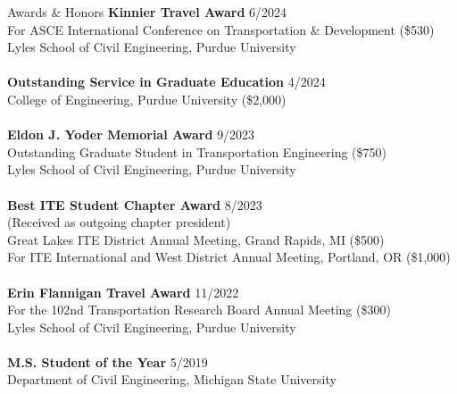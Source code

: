 \documentclass{CV} %
\begin{document}
\begin{rSection}{Awards \& Honors}%
    \textbf{Kinnier Travel Award} \hfill {6/2024}
    \\ For ASCE International Conference on Transportation \& Development (\$530)
    \\ Lyles School of Civil Engineering, Purdue University \\
    \\ \textbf{Outstanding Service in Graduate Education} \hfill {4/2024}
    \\ College of Engineering, Purdue University (\$2,000) \\
    \\ \textbf{Eldon J. Yoder Memorial Award} \hfill {9/2023}
    \\ Outstanding Graduate Student in Transportation Engineering (\$750)
    \\ Lyles School of Civil Engineering, Purdue University \\
    \\ \textbf{Best ITE Student Chapter Award} \hfill {8/2023}
    \\ (Received as outgoing chapter president)
    \\ Great Lakes ITE District Annual Meeting, Grand Rapids, MI (\$500)
    \\ For ITE International and West District Annual Meeting, Portland, OR (\$1,000) \\
    \\ \textbf{Erin Flannigan Travel Award} \hfill {11/2022}
    \\ For the 102nd Transportation Research Board Annual Meeting (\$300)
    \\ Lyles School of Civil Engineering, Purdue University \\
    \\ \textbf{M.S. Student of the Year} \hfill {5/2019}
    \\ Department of Civil Engineering, Michigan State University \\

\end{rSection}
\end{document}
